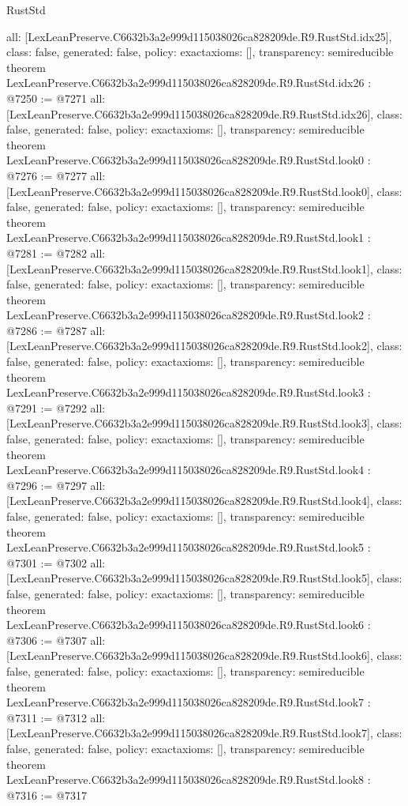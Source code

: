 \begin{lexlean}{RustStd}
\begin{coremodule}
{  all: [LexLeanPreserve.C6632b3a2e999d115038026ca828209de.R9.RustStd.idx25],
  class: false,
  generated: false,
  policy: exact{axioms: []},
  transparency: semireducible
}
theorem LexLeanPreserve.C6632b3a2e999d115038026ca828209de.R9.RustStd.idx26 : @7250 := @7271 {
  all: [LexLeanPreserve.C6632b3a2e999d115038026ca828209de.R9.RustStd.idx26],
  class: false,
  generated: false,
  policy: exact{axioms: []},
  transparency: semireducible
}
theorem LexLeanPreserve.C6632b3a2e999d115038026ca828209de.R9.RustStd.look0 : @7276 := @7277 {
  all: [LexLeanPreserve.C6632b3a2e999d115038026ca828209de.R9.RustStd.look0],
  class: false,
  generated: false,
  policy: exact{axioms: []},
  transparency: semireducible
}
theorem LexLeanPreserve.C6632b3a2e999d115038026ca828209de.R9.RustStd.look1 : @7281 := @7282 {
  all: [LexLeanPreserve.C6632b3a2e999d115038026ca828209de.R9.RustStd.look1],
  class: false,
  generated: false,
  policy: exact{axioms: []},
  transparency: semireducible
}
theorem LexLeanPreserve.C6632b3a2e999d115038026ca828209de.R9.RustStd.look2 : @7286 := @7287 {
  all: [LexLeanPreserve.C6632b3a2e999d115038026ca828209de.R9.RustStd.look2],
  class: false,
  generated: false,
  policy: exact{axioms: []},
  transparency: semireducible
}
theorem LexLeanPreserve.C6632b3a2e999d115038026ca828209de.R9.RustStd.look3 : @7291 := @7292 {
  all: [LexLeanPreserve.C6632b3a2e999d115038026ca828209de.R9.RustStd.look3],
  class: false,
  generated: false,
  policy: exact{axioms: []},
  transparency: semireducible
}
theorem LexLeanPreserve.C6632b3a2e999d115038026ca828209de.R9.RustStd.look4 : @7296 := @7297 {
  all: [LexLeanPreserve.C6632b3a2e999d115038026ca828209de.R9.RustStd.look4],
  class: false,
  generated: false,
  policy: exact{axioms: []},
  transparency: semireducible
}
theorem LexLeanPreserve.C6632b3a2e999d115038026ca828209de.R9.RustStd.look5 : @7301 := @7302 {
  all: [LexLeanPreserve.C6632b3a2e999d115038026ca828209de.R9.RustStd.look5],
  class: false,
  generated: false,
  policy: exact{axioms: []},
  transparency: semireducible
}
theorem LexLeanPreserve.C6632b3a2e999d115038026ca828209de.R9.RustStd.look6 : @7306 := @7307 {
  all: [LexLeanPreserve.C6632b3a2e999d115038026ca828209de.R9.RustStd.look6],
  class: false,
  generated: false,
  policy: exact{axioms: []},
  transparency: semireducible
}
theorem LexLeanPreserve.C6632b3a2e999d115038026ca828209de.R9.RustStd.look7 : @7311 := @7312 {
  all: [LexLeanPreserve.C6632b3a2e999d115038026ca828209de.R9.RustStd.look7],
  class: false,
  generated: false,
  policy: exact{axioms: []},
  transparency: semireducible
}
theorem LexLeanPreserve.C6632b3a2e999d115038026ca828209de.R9.RustStd.look8 : @7316 := @7317 {
}
\end{coremodule}
\end{lexlean}
